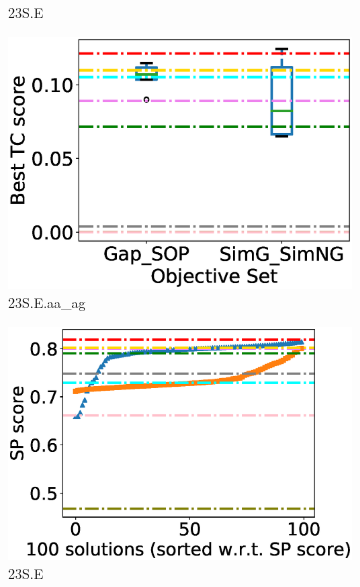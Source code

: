 \begin{figure}[!htbp]
\begin{adjustwidth}{-0.5cm}{-0.5cm}
\begin{subfigure}{0.25\textwidth}
			\caption{23S.E}
\end{subfigure}    
		\begin{subfigure}{0.25\textwidth}
			\includegraphics[width=\columnwidth]{Figure/summary/precomputedInit/23S.E.aa_ag/objset_tc_rank}
			\caption{23S.E.aa\_ag}
\end{subfigure}
\begin{subfigure}{0.25\textwidth}
			\includegraphics[width=\columnwidth]{Figure/summary/precomputedInit/23S.E/pairs_density_single_run}
			\caption{23S.E}
\end{subfigure}    
		\begin{subfigure}{0.25\textwidth}

\end{subfigure}
\end{adjustwidth}
\end{figure}
